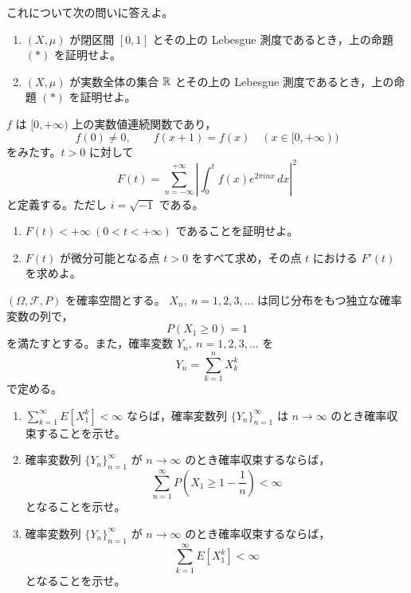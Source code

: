 これについて次の問いに答えよ。

\begin{enumerate}
  \item \((X,\mu)\) が閉区間 \([0,1]\) とその上の Lebesgue 測度であるとき，上の命題 \((*)\) を証明せよ。
  \item \((X,\mu)\) が実数全体の集合 \(\mathbb{R}\) とその上の Lebesgue 測度であるとき，上の命題 \((*)\) を証明せよ。
\end{enumerate}


\(f\) は \([0,+\infty)\) 上の実数値連続関数であり，
\[
  f(0)\ne0,\qquad f(x+1)=f(x)\quad (x\in[0,+\infty))
\]
をみたす。\(t>0\) に対して
\[
  F(t)=\sum_{n=-\infty}^{+\infty}
  \left|\int_0^t f(x)e^{2\pi i n x}\,dx\right|^2
\]
と定義する。ただし \(i=\sqrt{-1}\) である。

\begin{enumerate}
  \item \(F(t)<+\infty\ (0<t<+\infty)\) であることを証明せよ。
  \item \(F(t)\) が微分可能となる点 \(t>0\) をすべて求め，その点 \(t\) における \(F'(t)\) を求めよ。
\end{enumerate}


\((\Omega,\mathcal F,P)\) を確率空間とする。
\(X_n,\ n=1,2,3,\ldots\) は同じ分布をもつ独立な確率変数の列で，
\[
  P(X_1\ge0)=1
\]
を満たすとする。また，確率変数 \(Y_n,\ n=1,2,3,\ldots\) を
\[
  Y_n=\sum_{k=1}^{n}X_k^k
\]
で定める。

\begin{enumerate}
  \item \(\displaystyle \sum_{k=1}^{\infty}E[X_1^k]<\infty\) ならば，確率変数列
  \(\{Y_n\}_{n=1}^{\infty}\) は \(n\to\infty\) のとき確率収束することを示せ。
  \item 確率変数列 \(\{Y_n\}_{n=1}^{\infty}\) が \(n\to\infty\) のとき確率収束するならば，
  \[
    \sum_{n=1}^{\infty}P\left(X_1\ge 1-\frac1n\right)<\infty
  \]
  となることを示せ。
  \item 確率変数列 \(\{Y_n\}_{n=1}^{\infty}\) が \(n\to\infty\) のとき確率収束するならば，
  \[
    \sum_{k=1}^{\infty}E[X_1^k]<\infty
  \]
  となることを示せ。
\end{enumerate}

